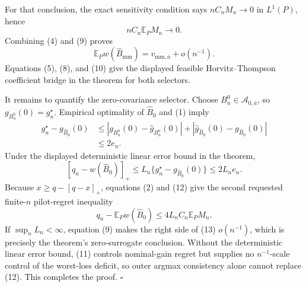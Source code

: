For that conclusion, the exact sensitivity condition says \(nC_nM_n\to0\) in \(L^1(P)\), hence
\[
 nC_n\mathbb E_PM_n\longrightarrow0.
 \tag{9}
\]
Combining (4) and (9) proves
\[
 \mathbb E_Pw(\widehat B_{\mathrm{mm}})
 =v_{\mathrm{mm},\overline a}+o(n^{-1}).
 \tag{10}
\]
Equations (5), (8), and (10) give the displayed feasible Horvitz--Thompson coefficient bridge in the theorem for both selectors.

It remains to quantify the zero-covariance selector.  Choose \(B_n^0\in\mathcal A_{0,\overline a}\), so \(g_{B_n^0}(0)=g_n^\star\).  Empirical optimality of \(\widehat B_0\) and (1) imply
\[
 \begin{aligned}
 g_n^\star-g_{\widehat B_0}(0)
 &\leq
 |g_{B_n^0}(0)-\widehat g_{B_n^0}(0)|
 +|\widehat g_{\widehat B_0}(0)-g_{\widehat B_0}(0)|\\
 &\leq2e_n.
 \end{aligned}
 \tag{11}
\]
Under the displayed deterministic linear error bound in the theorem,
\[
 [q_n-w(\widehat B_0)]_+
 \leq L_n\{g_n^\star-g_{\widehat B_0}(0)\}
 \leq2L_ne_n.
 \tag{12}
\]
Because \(x\geq q-[q-x]_+\), equations (2) and (12) give the second requested finite-\(n\) pilot-regret inequality
\[
 q_n-\mathbb E_Pw(\widehat B_0)
 \leq4L_nC_n\mathbb E_PM_n.
 \tag{13}
\]
If \(\sup_nL_n<\infty\), equation (9) makes the right side of (13) \(o(n^{-1})\), which is precisely the theorem's zero-surrogate conclusion.  Without the deterministic linear error bound, (11) controls nominal-gain regret but supplies no \(n^{-1}\)-scale control of the worst-loss deficit, so outer argmax consistency alone cannot replace (12).  This completes the proof. \(\square\)